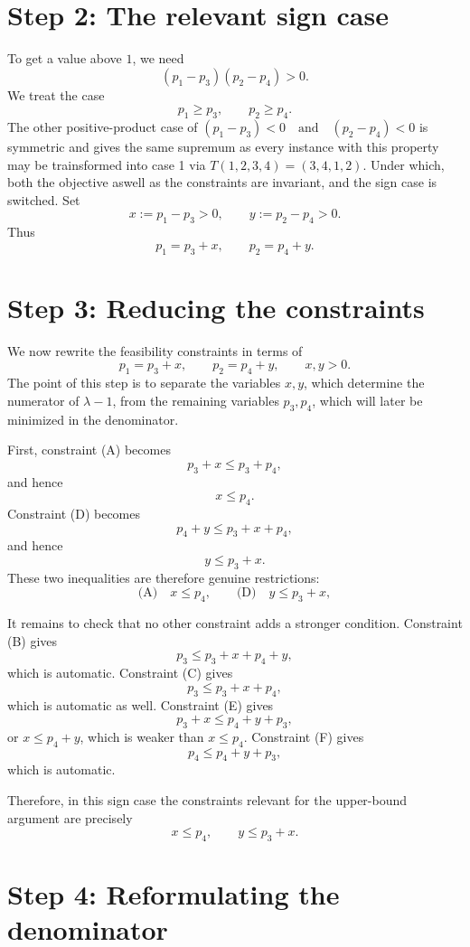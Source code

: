 \documentclass[11pt]{article}
\begin{document}
\section*{Step 2: The relevant sign case}

To get a value above \(1\), we need
\[
(p_1-p_3)(p_2-p_4)>0.
\]
We treat the case
\[
p_1\ge p_3,\qquad p_2\ge p_4.
\]
The other positive-product case of \((p_1-p_3) < 0 \quad \text{and} \quad(p_2-p_4) < 0\) is symmetric and gives
the same supremum as every instance with this property may be trainsformed into case 1 via \(T(1,2,3,4) = (3,4,1,2)\).
Under which, both the objective aswell as the constraints are invariant, and the sign case is switched.
Set
\[
x:=p_1-p_3>0,\qquad y:=p_2-p_4>0.
\]
Thus
\[
p_1=p_3+x,\qquad p_2=p_4+y.
\]

\section*{Step 3: Reducing the constraints}

We now rewrite the feasibility constraints in terms of
\[
p_1=p_3+x,\qquad p_2=p_4+y,
\qquad x,y>0.
\]
The point of this step is to separate the variables \(x,y\), which determine the numerator of \(\lambda-1\), from the remaining variables \(p_3,p_4\), which will later be minimized in the denominator.

First, constraint (A) becomes
\[
p_3+x\le p_3+p_4,
\]
and hence
\[
x\le p_4.
\]
Constraint (D) becomes
\[
p_4+y\le p_3+x+p_4,
\]
and hence
\[
y\le p_3+x.
\]
These two inequalities are therefore genuine restrictions:
\[
\text{(A)}\quad x\le p_4,
\qquad
\text{(D)}\quad y\le p_3+x,
\]

It remains to check that no other constraint adds a stronger condition. Constraint (B) gives
\[
p_3\le p_3+x+p_4+y,
\]
which is automatic. Constraint (C) gives
\[
p_3\le p_3+x+p_4,
\]
which is automatic as well. Constraint (E) gives
\[
p_3+x\le p_4+y+p_3,
\]
or \(x\le p_4+y\), which is weaker than \(x\le p_4\). Constraint (F) gives
\[
p_4\le p_4+y+p_3,
\]
which is automatic.

Therefore, in this sign case the constraints relevant for the upper-bound argument are precisely
\[
x\le p_4,\qquad y\le p_3+x.
\]

\section*{Step 4: Reformulating the denominator}
\end{document}
